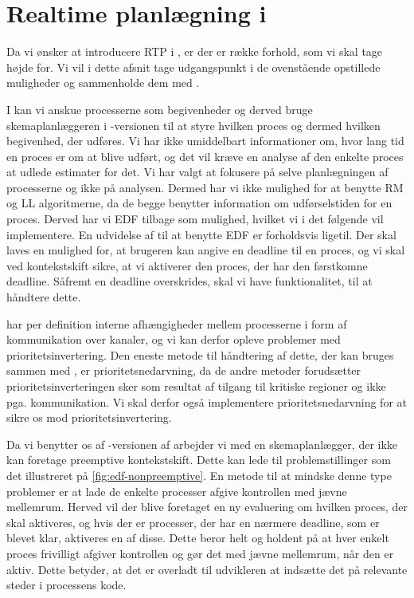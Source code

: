 \section{Realtime planlægning i \pycsp}
\label{sec:rtp-pycsp}
Da vi ønsker at introducere RTP i \pycsp, er der er række forhold, som vi skal tage højde for. Vi vil i dette afsnit tage udgangspunkt i de ovenstående opstillede muligheder og sammenholde dem med \pycsp. 

I \pycsp kan vi anskue processerne som begivenheder og derved bruge skemaplanlæggeren i -versionen til at styre hvilken proces og dermed hvilken begivenhed, der udføres. Vi har ikke umiddelbart informationer om, hvor lang tid en proces er om at blive udført, og det vil kræve en analyse af den enkelte proces at udlede estimater for det. Vi har valgt at fokusere på selve planlægningen af processerne og ikke på analysen. Dermed har vi ikke mulighed for at benytte RM og LL algoritmerne, da de begge benytter information om udførselstiden for en proces. Derved har vi EDF tilbage som mulighed, hvilket vi i det følgende vil implementere. En udvidelse af \pycsp til at benytte EDF er forholdsvis ligetil. Der skal laves en mulighed for, at brugeren kan angive en deadline til en proces, og vi skal ved kontekstskift sikre, at vi aktiverer den proces, der har den førstkomne deadline. Såfremt en deadline overskrides, skal vi have funktionalitet, til at håndtere dette. 

\pycsp har per definition interne afhængigheder mellem processerne i form af kommunikation over kanaler, og vi kan derfor opleve problemer med prioritetsinvertering. Den eneste metode til håndtering af dette, der kan bruges sammen med \pycsp, er prioritetsnedarvning, da de andre metoder forudsætter prioritetsinverteringen  sker som resultat af tilgang til kritiske regioner og ikke pga. kommunikation. Vi skal derfor også implementere prioritetsnedarvning for at sikre os mod prioritetsinvertering. 

Da vi benytter os af -versionen af \pycsp arbejder vi med en skemaplanlægger, der ikke kan foretage preemptive kontekstskift. Dette kan lede til problemstillinger som det illustreret på \cref{fig:edf-nonpreemptive}. En metode til at mindske denne type problemer er at lade de enkelte processer afgive kontrollen med jævne mellemrum. Herved vil der blive foretaget en ny evaluering om hvilken proces, der skal aktiveres, og hvis der er processer, der har en nærmere deadline, som er blevet klar, aktiveres en af disse. Dette beror helt og holdent på at hver enkelt proces frivilligt afgiver kontrollen og gør det med jævne mellemrum, når den er aktiv. Dette betyder, at det er overladt til udvikleren at indsætte det på relevante steder i processens kode. 

